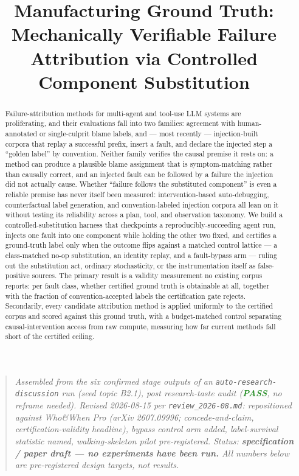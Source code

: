 \documentclass[11pt]{article}
\title{\textbf{Manufacturing Ground Truth:\\ Mechanically Verifiable Failure Attribution via Controlled Component Substitution}}
\author{}
\date{}
\begin{document}
\maketitle
\vspace{-2em}

\begin{quote}
\small\textit{Assembled from the six confirmed stage outputs of an \texttt{auto-research-discussion} run (seed topic B2.1), post research-taste audit (\textcolor{ForestGreen}{\textbf{PASS}}, no reframe needed). Revised 2026-08-15 per \texttt{review\_2026-08.md}: repositioned against Who\&When Pro (arXiv 2607.09996; concede-and-claim, certification-validity headline), bypass control arm added, label-survival statistic named, walking-skeleton pilot pre-registered. Status: \textbf{specification / paper draft --- no experiments have been run.} All numbers below are pre-registered design targets, not results.}
\end{quote}

\begin{abstract}
Failure-attribution methods for multi-agent and tool-use LLM systems are proliferating, and their evaluations fall into two families: agreement with human-annotated or single-culprit blame labels, and --- most recently --- injection-built corpora that replay a successful prefix, insert a fault, and declare the injected step a ``golden label'' by convention. Neither family verifies the causal premise it rests on: a method can produce a plausible blame assignment that is symptom-matching rather than causally correct, and an injected fault can be followed by a failure the injection did not actually cause. Whether ``failure follows the substituted component'' is even a reliable premise has never itself been measured: intervention-based auto-debugging, counterfactual label generation, and convention-labeled injection corpora all lean on it without testing its reliability across a plan, tool, and observation taxonomy. We build a controlled-substitution harness that checkpoints a reproducibly-succeeding agent run, injects one fault into one component while holding the other two fixed, and certifies a ground-truth label only when the outcome flips against a matched control lattice --- a class-matched no-op substitution, an identity replay, and a fault-bypass arm --- ruling out the substitution act, ordinary stochasticity, or the instrumentation itself as false-positive sources. The primary result is a validity measurement no existing corpus reports: per fault class, whether certified ground truth is obtainable at all, together with the fraction of convention-accepted labels the certification gate rejects. Secondarily, every candidate attribution method is applied uniformly to the certified corpus and scored against this ground truth, with a budget-matched control separating causal-intervention access from raw compute, measuring how far current methods fall short of the certified ceiling.
\end{abstract}
\end{document}
